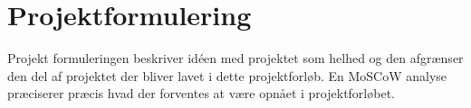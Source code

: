 \chapter{Projektformulering}

Projekt formuleringen beskriver idéen med projektet som helhed og den afgrænser den del af projektet der bliver lavet i dette projektforløb. En MoSCoW analyse præciserer præcis hvad der forventes at være opnået i projektforløbet.



